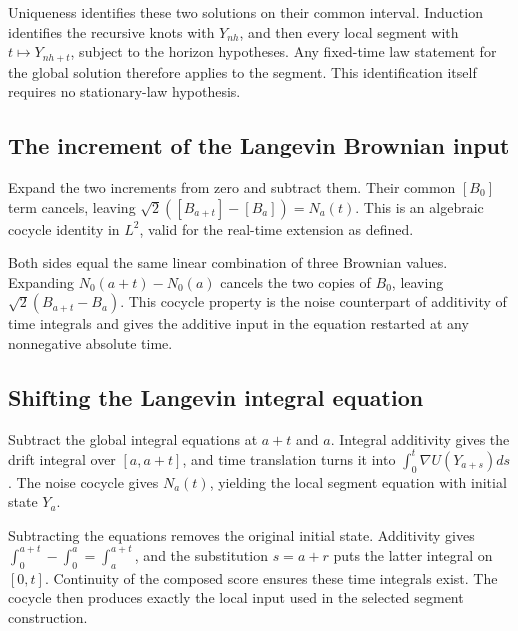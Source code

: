 \documentclass[11pt,a4paper]{report}
\begin{document}
Uniqueness identifies these two solutions on their common interval. Induction identifies the recursive knots with \(Y_{nh}\), and then every local segment with \(t\mapsto Y_{nh+t}\), subject to the horizon hypotheses. Any fixed-time law statement for the global solution therefore applies to the segment. This identification itself requires no stationary-law hypothesis.

\subsection{\texorpdfstring{The increment of the Langevin Brownian input}{The increment of the Langevin Brownian input}}
\label{report-step-UnadjustedLangevin-BrownianSegmentsGlobal-lean-1}


Expand the two increments from zero and subtract them. Their common \([B_0]\) term cancels, leaving \(\sqrt2([B_{a+t}]-[B_a])=N_a(t)\). This is an algebraic cocycle identity in \(L^2\), valid for the real-time extension as defined.



Both sides equal the same linear combination of three Brownian values. Expanding \(N_0(a+t)-N_0(a)\) cancels the two copies of \(B_0\), leaving \(\sqrt2(B_{a+t}-B_a)\). This cocycle property is the noise counterpart of additivity of time integrals and gives the additive input in the equation restarted at any nonnegative absolute time.

\subsection{\texorpdfstring{Shifting the Langevin integral equation}{Shifting the Langevin integral equation}}
\label{report-step-UnadjustedLangevin-BrownianSegmentsGlobal-lean-2}


Subtract the global integral equations at \(a+t\) and \(a\). Integral additivity gives the drift integral over \([a,a+t]\), and time translation turns it into \(\int_0^t\nabla U(Y_{a+s})ds\). The noise cocycle gives \(N_a(t)\), yielding the local segment equation with initial state \(Y_a\).



Subtracting the equations removes the original initial state. Additivity gives \(\int_0^{a+t}-\int_0^a=\int_a^{a+t}\), and the substitution \(s=a+r\) puts the latter integral on \([0,t]\). Continuity of the composed score ensures these time integrals exist. The cocycle then produces exactly the local input used in the selected segment construction.
\end{document}
